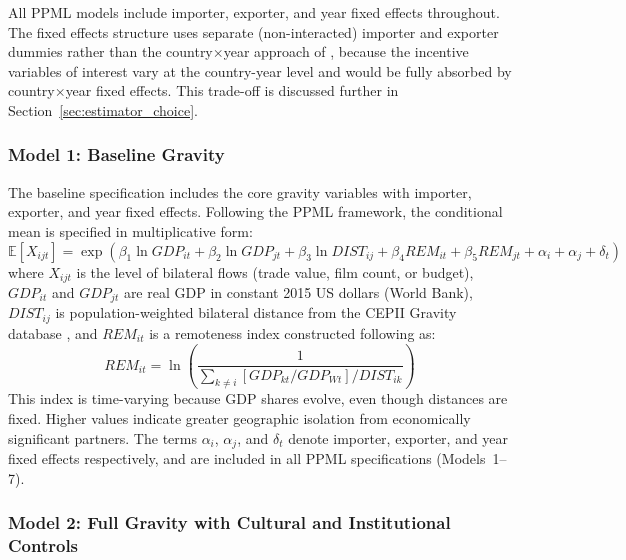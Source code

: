 All PPML models include importer, exporter, and year fixed effects throughout. The fixed effects structure uses separate (non-interacted) importer and exporter dummies rather than the country$\times$year approach of \citet{baier2009}, because the incentive variables of interest vary at the country-year level and would be fully absorbed by country$\times$year fixed effects. This trade-off is discussed further in Section~\ref{sec:estimator_choice}.

\subsubsection{Model 1: Baseline Gravity}

The baseline specification includes the core gravity variables with importer, exporter, and year fixed effects. Following the PPML framework, the conditional mean is specified in multiplicative form:
\begin{equation}
\mathbb{E}[X_{ijt}] = \exp\left(\beta_1 \ln GDP_{it} + \beta_2 \ln GDP_{jt} + \beta_3 \ln DIST_{ij} + \beta_4 REM_{it} + \beta_5 REM_{jt} + \alpha_i + \alpha_j + \delta_t\right)
\label{eq:model1}
\end{equation}
where $X_{ijt}$ is the level of bilateral flows (trade value, film count, or budget), $GDP_{it}$ and $GDP_{jt}$ are real GDP in constant 2015 US dollars (World Bank), $DIST_{ij}$ is population-weighted bilateral distance from the CEPII Gravity database \citep{conte2022}, and $REM_{it}$ is a remoteness index constructed following \citet{baier2009} as:
\begin{equation}
REM_{it} = \ln\left(\frac{1}{\sum_{k \neq i} \left[GDP_{kt} / GDP_{Wt}\right] / DIST_{ik}}\right)
\label{eq:remoteness}
\end{equation}
This index is time-varying because GDP shares evolve, even though distances are fixed. Higher values indicate greater geographic isolation from economically significant partners. The terms $\alpha_i$, $\alpha_j$, and $\delta_t$ denote importer, exporter, and year fixed effects respectively, and are included in all PPML specifications (Models~1--7).

\subsubsection{Model 2: Full Gravity with Cultural and Institutional Controls}

